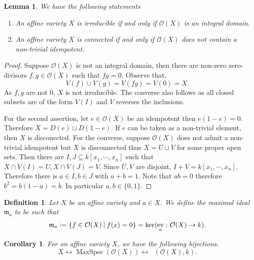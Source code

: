 \documentclass[10pt]{article}
\newtheorem{definition}{Definition}[section]
\newtheorem{lemma}{Lemma}[section]
\newtheorem{corollary}{Corollary} [section]
\numberwithin{equation}{theorem}
\DeclareMathOperator{\ev}{ev}
\DeclareMathOperator{\Homk}{Hom_{k-alg}}
\DeclareMathOperator{\Ker}{ker}
\DeclareMathOperator{\MaxSpec}{MaxSpec}
\newcommand{\defeq}{\vcentcolon=}
\newcommand{\m}[0]{\mathfrak{m}}
\newcommand{\Ouv}[0]{\mathcal{O}}
\begin{document}
\begin{lemma}We have the following statements
\begin{enumerate}[(1).]
\item An affine variety $X$ is irreducible if and only if $\mathcal{O}(X)$ is an integral domain.
\item An affine variety $X$ is connected if and only if $\mathcal{O}(X)$ does not contain a non-trivial idempotent.
\end{enumerate}
\end{lemma}

\begin{proof}
Suppose $\Ouv(X)$ is not an integral domain, then there are non-zero zero-divisors $f,g\in\Ouv(X)$ such that $fg=0$. Observe that,
\begin{equation*}
  V(f)\cup V(g) = V(fg) = V(0) = X.
\end{equation*}
As $f,g$ are not $0$, $X$ is not irreducible. The converse also follows as all closed subsets are of the form $V(I)$ and $V$ reverses the inclusions.
\par For the second assertion, let $e\in\Ouv(X)$ be an idempotent then $e(1-e)=0$. Therefore $X = D(e)\sqcup D(1-e)$. If $e$ can be taken as a non-trivial element, then $X$ is disconected. 
For the converse, suppose $\Ouv(X)$ does not admit a non-trivial idempotent but $X$ is disconnected thus $X=U\sqcup V$ for some proper open sets. Then there are $I,J\subseteq k[x_1,\cdots,x_n]$ such that $X\cap V(I)=U,X\cap V(J) = V$. Since $U,V$ are disjoint, $I+V = k[x_1,\cdots,x_n]$.
Therefore there is $a\in I,b\in J$ with $a+b = 1$. Note that $ab = 0$ therefore $b^2 = b(1-a) = b$. In particular $a,b\in \{0,1\}$. 
\end{proof}

\begin{definition}
Let $X$ be an affine variety and $a\in X$. We define the maximal ideal $\m_a$ to be such that 
\begin{equation*}
\m_a \defeq \{f\in\mathcal{O}(X)\:|\: f(x) = 0\} = \Ker(\ev_a:\mathcal{O}(X)\to k).
\end{equation*}
\end{definition}

\begin{corollary}
  \label{corollary_1_3}
For an affine variety $X$, we have the following bijections.
\begin{equation*}
X\leftrightarrow\MaxSpec(\mathcal{O}(X)) \leftrightarrow \Homk(\Ouv(X),k).
\end{equation*}
\end{corollary}
\end{document}
